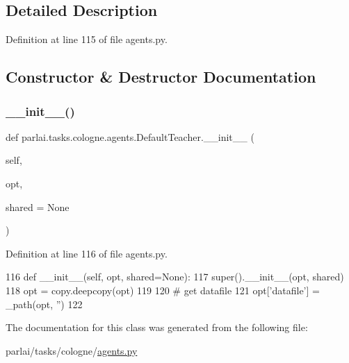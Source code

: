 \subsection{Detailed Description}


Definition at line 115 of file agents.\+py.



\subsection{Constructor \& Destructor Documentation}
\mbox{\label{classparlai_1_1tasks_1_1cologne_1_1agents_1_1DefaultTeacher_ad318d4fbe6bd62f2bafb48324d4c4efe}} 
\subsubsection{\texorpdfstring{\+\_\+\+\_\+init\+\_\+\+\_\+()}{\_\_init\_\_()}}
{\footnotesize\ttfamily def parlai.\+tasks.\+cologne.\+agents.\+Default\+Teacher.\+\_\+\+\_\+init\+\_\+\+\_\+ (\begin{DoxyParamCaption}\item[{}]{self,  }\item[{}]{opt,  }\item[{}]{shared = {\ttfamily None} }\end{DoxyParamCaption})}



Definition at line 116 of file agents.\+py.


\begin{DoxyCode}
116     \textcolor{keyword}{def }\_\_init\_\_(self, opt, shared=None):
117         super().\_\_init\_\_(opt, shared)
118         opt = copy.deepcopy(opt)
119 
120         \textcolor{comment}{# get datafile}
121         opt[\textcolor{stringliteral}{'datafile'}] = \_path(opt, \textcolor{stringliteral}{''})
122 \end{DoxyCode}


The documentation for this class was generated from the following file\+:\begin{DoxyCompactItemize}
\item 
parlai/tasks/cologne/\hyperlink{parlai_2tasks_2cologne_2agents_8py}{agents.\+py}\end{DoxyCompactItemize}
